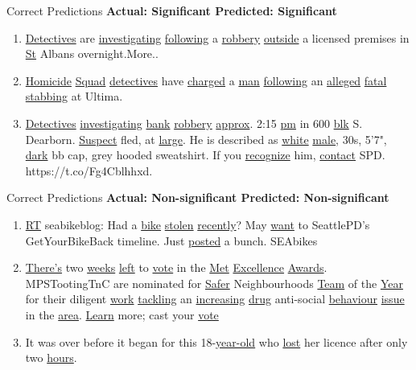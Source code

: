\documentclass[12pt]{beamer}
\begin{document}
\begin{frame}{Correct Predictions}
    \textbf{Actual: Significant \hfill Predicted: Significant}
    \begin{enumerate}
        \item \underline{Detectives} are \underline{investigating} \underline{following} a \underline{robbery} \underline{outside} a licensed premises in \underline{St} Albans overnight.More..
        \item \underline{Homicide} \underline{Squad} \underline{detectives} have \underline{charged} a \underline{man} \underline{following} an \underline{alleged} \underline{fatal} \underline{stabbing} at Ultima.
        \item \underline{Detectives} \underline{investigating} \underline{bank} \underline{robbery} \underline{approx}. 2:15 \underline{pm} in 600 \underline{blk} S. Dearborn.  \underline{Suspect} fled, at \underline{large}. He is described as \underline{white} \underline{male}, 30s, 5'7", \underline{dark} bb cap, grey hooded sweatshirt. If you \underline{recognize} him, \underline{contact} SPD. https://t.co/Fg4Cblhhxd.
    \end{enumerate}
\end{frame}

\begin{frame}{Correct Predictions}
    \textbf{Actual: Non-significant \hfill Predicted: Non-significant}
    \begin{enumerate}
        \item \underline{RT} seabikeblog: Had a \underline{bike} \underline{stolen} \underline{recently}? May \underline{want} to SeattlePD’s GetYourBikeBack timeline. Just \underline{posted} a bunch. SEAbikes
        \item \underline{There's} two \underline{weeks} \underline{left} to \underline{vote} in the \underline{Met} \underline{Excellence} \underline{Awards}. MPSTootingTnC are nominated for \underline{Safer} Neighbourhoods \underline{Team} of the \underline{Year} for their diligent \underline{work} \underline{tackling} an \underline{increasing} \underline{drug} anti-social \underline{behaviour} \underline{issue} in the \underline{area}. \underline{Learn} more; cast your \underline{vote}
        \item It was over before it began for this 18-\underline{year-old} who \underline{lost} her licence after only two \underline{hours}.
    \end{enumerate}
\end{frame}
\end{document}

